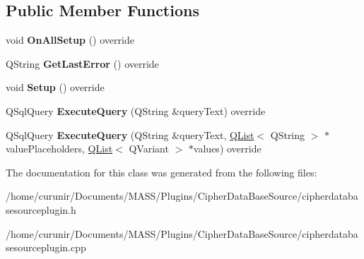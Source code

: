 \subsection*{Public Member Functions}
\begin{DoxyCompactItemize}
\item 
void {\bfseries On\+All\+Setup} () override\hypertarget{class_cipher_data_base_source_plugin_a17963e88c679924dc37da6ded9e71da6}{}\label{class_cipher_data_base_source_plugin_a17963e88c679924dc37da6ded9e71da6}

\item 
Q\+String {\bfseries Get\+Last\+Error} () override\hypertarget{class_cipher_data_base_source_plugin_a4a32c746ef184f6cbdc2cfb37c872c5d}{}\label{class_cipher_data_base_source_plugin_a4a32c746ef184f6cbdc2cfb37c872c5d}

\item 
void {\bfseries Setup} () override\hypertarget{class_cipher_data_base_source_plugin_aeec7843b9e6ad2c36a0e2929a1626436}{}\label{class_cipher_data_base_source_plugin_aeec7843b9e6ad2c36a0e2929a1626436}

\item 
Q\+Sql\+Query {\bfseries Execute\+Query} (Q\+String \&query\+Text) override\hypertarget{class_cipher_data_base_source_plugin_a02d5a7888d88142660ca6ea5982446ec}{}\label{class_cipher_data_base_source_plugin_a02d5a7888d88142660ca6ea5982446ec}

\item 
Q\+Sql\+Query {\bfseries Execute\+Query} (Q\+String \&query\+Text, \hyperlink{class_q_list}{Q\+List}$<$ Q\+String $>$ $\ast$value\+Placeholders, \hyperlink{class_q_list}{Q\+List}$<$ Q\+Variant $>$ $\ast$values) override\hypertarget{class_cipher_data_base_source_plugin_aa2abe6b9929628fbb7feb62ed09b1111}{}\label{class_cipher_data_base_source_plugin_aa2abe6b9929628fbb7feb62ed09b1111}

\end{DoxyCompactItemize}


The documentation for this class was generated from the following files\+:\begin{DoxyCompactItemize}
\item 
/home/curunir/\+Documents/\+M\+A\+S\+S/\+Plugins/\+Cipher\+Data\+Base\+Source/cipherdatabasesourceplugin.\+h\item 
/home/curunir/\+Documents/\+M\+A\+S\+S/\+Plugins/\+Cipher\+Data\+Base\+Source/cipherdatabasesourceplugin.\+cpp\end{DoxyCompactItemize}
